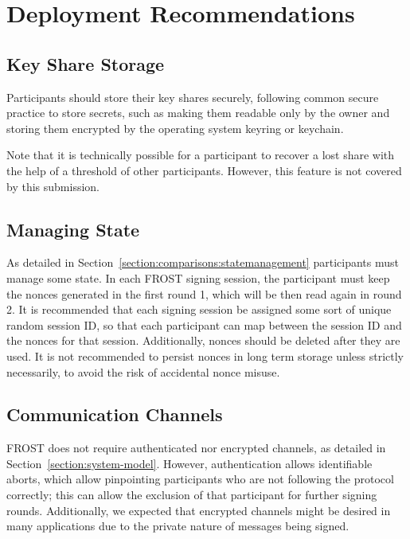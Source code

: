 \section{Deployment Recommendations}\label{section:deployment-recommendations}


\subsection{Key Share Storage}

Participants should store their key shares securely, following common secure
practice to store secrets, such as making them readable only by the owner and
storing them encrypted by the operating system keyring or keychain.

Note that it is technically possible for a participant to recover a lost share
with the help of a threshold of other participants. However, this feature is
not covered by this submission.


\subsection{Managing State}

As detailed in Section~\ref{section:comparisons:statemanagement} participants must
manage some state. In each FROST signing session, the participant must keep the
nonces generated in the first round 1, which will be then read again in round 2.
It is recommended that each signing session be assigned some sort of unique
random session ID, so that each participant can map between the session ID and
the nonces for that session. Additionally, nonces should be deleted after they
are used. It is not recommended to persist nonces in long term storage unless
strictly necessarily, to avoid the risk of accidental nonce misuse.

\subsection{Communication Channels}

FROST does not require authenticated nor encrypted channels, as detailed
in Section~\ref{section:system-model}. However, authentication allows identifiable
aborts, which allow pinpointing participants who are not following the protocol
correctly; this can allow the exclusion of that participant for further signing
rounds. Additionally, we expected that encrypted channels might be desired in
many applications due to the private nature of messages being signed.

